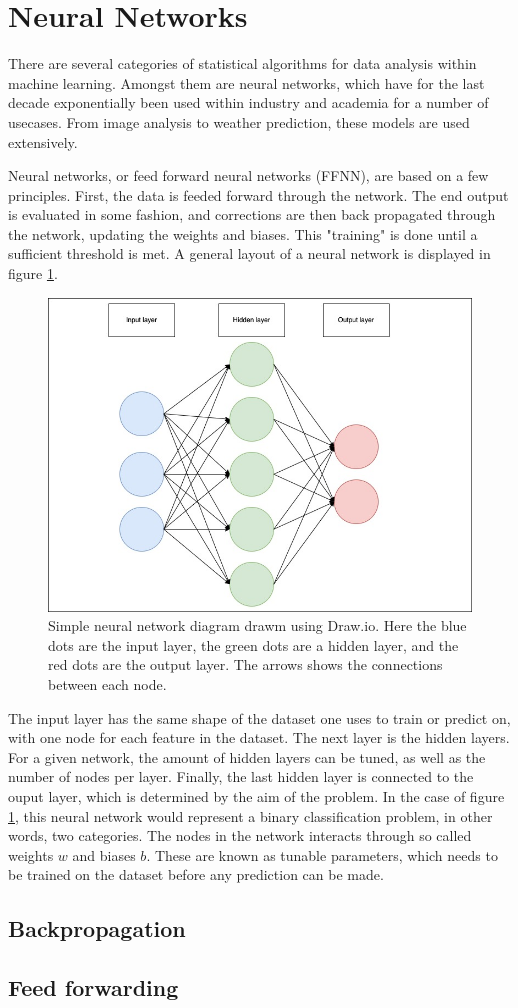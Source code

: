 \section*{Neural Networks}
There are several categories of statistical algorithms for data analysis within machine learning.
Amongst them are neural networks, which have for the last decade exponentially been used
within industry and academia for a number of usecases. From image analysis to weather prediction,
these models are used extensively. \par
Neural networks, or feed forward neural networks (FFNN), are based on a few principles.
First, the data is feeded forward through the network. The end output is evaluated in some fashion, 
and corrections are then back propagated through the network, updating the weights and biases. 
This "training" is done until a sufficient threshold is met. A general layout of a neural network is displayed in
figure \ref{fig:nndiagram}.

\begin{figure}
    \includegraphics[width=\linewidth]{Figures/Machinelearning/nn_diagram.jpeg}
    \caption{Simple neural network diagram drawm using Draw.io. Here the blue dots are the input layer, the green dots are a hidden layer, and the red dots are the output layer. The arrows shows the connections between each node. }
    \label{fig:nndiagram}
\end{figure}

The input layer has the same shape of the dataset one uses to train or predict on, with one node for each feature in the dataset.
The next layer is the hidden layers. For a given network, the amount of hidden layers can be tuned, as well as the number of 
nodes per layer. Finally, the last hidden layer is connected to the ouput layer, which is determined by the aim of the problem. 
In the case of figure \ref{fig:nndiagram}, this neural network would represent a binary classification problem, in other words, two categories. 
The nodes in the network interacts through so called weights $w$ and biases $b$. These are known as tunable parameters, 
which needs to be trained on the dataset before any prediction can be made. 


\subsection*{Backpropagation}

\subsection*{Feed forwarding}